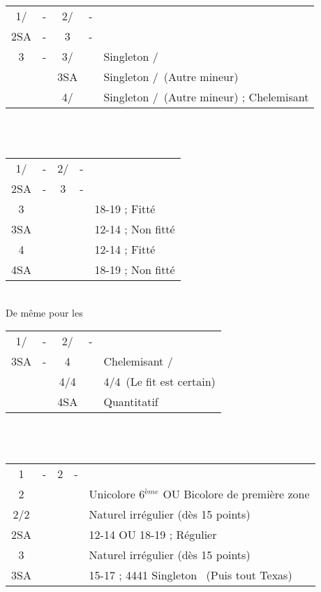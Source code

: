 \documentclass[a4paper, oneside, 11pt]{report}
\begin{document}
		\begin{tabular}{cccc|l}
		1\trefle/\carreau & - & 2\trefle/\carreau & - &\\
		2SA & - & 3\trefle & - &\\
		3\carreau & - & 3\coeur/\pique && Singleton \coeur/\pique\\	
		&& 3SA && Singleton \carreau/\trefle\ (Autre mineur)\\
		&& 4\trefle/\carreau && Singleton \carreau/\trefle\ (Autre mineur) ; Chelemisant\\
		\end{tabular}\\\\

		\begin{tabular}{cccc|l}
		1\trefle/\carreau & - & 2\trefle/\carreau & - &\\
		2SA & - & 3\carreau & - &\\
		3\coeur &&&& 18-19 ; Fitté\\
		3SA &&&& 12-14 ; Non fitté\\
		4\coeur &&&& 12-14 ; Fitté\\
		4SA &&&& 18-19 ; Non fitté\\
		\end{tabular}\\
		De même pour les \pique\\

		\begin{tabular}{cccc|l}
		1\trefle/\carreau & - & 2\trefle/\carreau & - &\\
		3SA & - & 4\trefle && Chelemisant \trefle/\carreau\\
		&& 4\carreau/4\coeur && 4\coeur/4\pique\ (Le fit est certain)\\
		&& 4SA && Quantitatif\\
		\end{tabular}\\\\

\newpage
		\begin{tabular}{cccc|l}
		1\carreau & - & 2\trefle & - &\\
		2\carreau &&&& Unicolore 6$^{ème}$ OU Bicolore de première zone\\
		2\coeur/2\pique &&&& Naturel irrégulier (dès 15 points) \\
		2SA &&&& 12-14 OU 18-19 ; Régulier\\
		3\trefle &&&& Naturel irrégulier (dès 15 points)\\
		3SA &&&& 15-17 ; 4441 Singleton \trefle\ (Puis tout Texas)\\
		\end{tabular}\\\\
\end{document}
